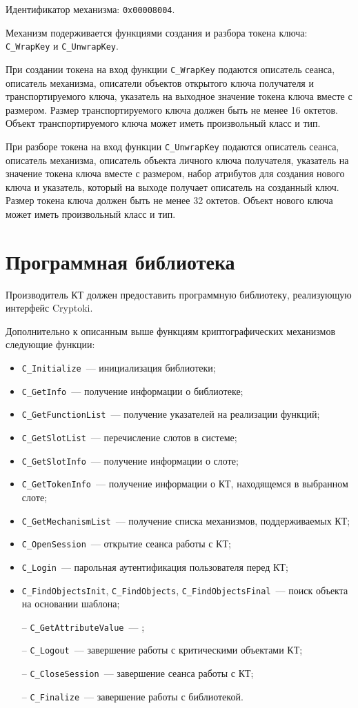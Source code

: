 Идентификатор механизма: \texttt{0x00008004}.

Механизм подерживается функциями создания и разбора токена ключа:
\verb|C_WrapKey| и \verb|C_UnwrapKey|.

При создании токена на вход функции \verb|C_WrapKey| подаются
описатель сеанса, описатель механизма, описатели объектов открытого ключа
получателя и транспортируемого ключа, указатель на
выходное значение токена ключа вместе с размером.
Размер транспортируемого ключа должен быть не менее 16 октетов.
Объект транспортируемого ключа может иметь произвольный класс и тип.

При разборе токена на вход функции \verb|C_UnwrapKey| подаются
описатель сеанса, описатель механизма, описатель объекта личного ключа
получателя, указатель на значение токена ключа вместе с размером,
набор атрибутов для создания нового ключа и указатель,
который на выходе получает описатель на созданный ключ.
Размер токена ключа должен быть не менее 32 октетов.
Объект нового ключа может иметь произвольный класс и тип.

\section{Программная библиотека}

Производитель КТ должен предоставить программную библиотеку, реализующую
интерфейс Cryptoki. 

Дополнительно к описанным выше функциям криптографических механизмов 
 следующие функции:
\begin{itemize}
\item
\verb|C_Initialize|~--- инициализация библиотеки;
\item
\verb|C_GetInfo|~--- получение информации о библиотеке;
\item
\verb|C_GetFunctionList|~--- получение указателей на реализации функций;
\item
\verb|C_GetSlotList|~--- перечисление слотов в системе;
\item
\verb|C_GetSlotInfo|~--- получение информации о слоте;
\item
\verb|C_GetTokenInfo|~--- получение информации о КТ, находящемся в 
выбранном слоте;
\item
\verb|C_GetMechanismList|~--- 
получение списка механизмов, поддерживаемых КТ;
\item
\verb|C_OpenSession|~--- открытие сеанса работы с КТ;
\item
\verb|C_Login|~--- парольная аутентификация пользователя перед КТ;
\item
\verb|C_FindObjectsInit|, \verb|C_FindObjects|, 
\verb|C_FindObjectsFinal|~---
поиск объекта на основании шаблона;
\item[--]
\verb|C_GetAttributeValue|~--- ;
\item[--]
\verb|C_Logout|~--- завершение работы с критическими объектами КТ;
\item[--]
\verb|C_CloseSession|~--- завершение сеанса работы с КТ;
\item[--]
\verb|C_Finalize|~--- завершение работы с библиотекой.
\end{itemize}

